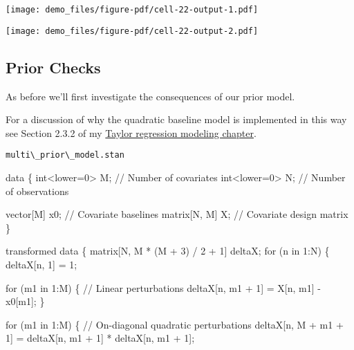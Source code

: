 \documentclass[
  letterpaper,
  DIV=11,
  numbers=noendperiod]{scrartcl}
\newenvironment{Shaded}{\begin{snugshade}}{\end{snugshade}}
\newcommand{\CommentTok}[1]{\textcolor[rgb]{0.37,0.37,0.37}{#1}}
\newcommand{\ControlFlowTok}[1]{\textcolor[rgb]{0.00,0.23,0.31}{#1}}
\newcommand{\DataTypeTok}[1]{\textcolor[rgb]{0.68,0.00,0.00}{#1}}
\newcommand{\DecValTok}[1]{\textcolor[rgb]{0.68,0.00,0.00}{#1}}
\newcommand{\KeywordTok}[1]{\textcolor[rgb]{0.00,0.23,0.31}{#1}}
\newcommand{\NormalTok}[1]{\textcolor[rgb]{0.00,0.23,0.31}{#1}}
\begin{document}
\texttt{[image: demo\_files/figure-pdf/cell-22-output-1.pdf]}

\texttt{[image: demo\_files/figure-pdf/cell-22-output-2.pdf]}

\subsection{Prior Checks}\label{prior-checks-1}

As before we'll first investigate the consequences of our prior model.

For a discussion of why the quadratic baseline model is implemented in
this way see Section 2.3.2 of my
\href{https://betanalpha.github.io/assets/case_studies/taylor_models.html\#232_Higher-Order_Implementations}{Taylor
regression modeling chapter}.

\begin{codelisting}

\caption{\texttt{multi\textbackslash\_prior\textbackslash\_model.stan}}

\begin{Shaded}
\begin{Highlighting}[]
\KeywordTok{data}\NormalTok{ \{}
  \DataTypeTok{int}\NormalTok{\textless{}}\KeywordTok{lower}\NormalTok{=}\DecValTok{0}\NormalTok{\textgreater{} M;  }\CommentTok{// Number of covariates}
  \DataTypeTok{int}\NormalTok{\textless{}}\KeywordTok{lower}\NormalTok{=}\DecValTok{0}\NormalTok{\textgreater{} N;  }\CommentTok{// Number of observations}
  
  \DataTypeTok{vector}\NormalTok{[M] x0;    }\CommentTok{// Covariate baselines}
  \DataTypeTok{matrix}\NormalTok{[N, M] X;  }\CommentTok{// Covariate design matrix}
\NormalTok{\}}

\KeywordTok{transformed data}\NormalTok{ \{}
  \DataTypeTok{matrix}\NormalTok{[N, M * (M + }\DecValTok{3}\NormalTok{) / }\DecValTok{2}\NormalTok{ + }\DecValTok{1}\NormalTok{] deltaX;}
  \ControlFlowTok{for}\NormalTok{ (n }\ControlFlowTok{in} \DecValTok{1}\NormalTok{:N) \{}
\NormalTok{    deltaX[n, }\DecValTok{1}\NormalTok{] = }\DecValTok{1}\NormalTok{;}
    
    \ControlFlowTok{for}\NormalTok{ (m1 }\ControlFlowTok{in} \DecValTok{1}\NormalTok{:M) \{}
      \CommentTok{// Linear perturbations}
\NormalTok{      deltaX[n, m1 + }\DecValTok{1}\NormalTok{] = X[n, m1] {-} x0[m1];}
\NormalTok{    \}}
    
    \ControlFlowTok{for}\NormalTok{ (m1 }\ControlFlowTok{in} \DecValTok{1}\NormalTok{:M) \{}
      \CommentTok{// On{-}diagonal quadratic perturbations}
\NormalTok{      deltaX[n, M + m1 + }\DecValTok{1}\NormalTok{] }
\NormalTok{        = deltaX[n, m1 + }\DecValTok{1}\NormalTok{] * deltaX[n, m1 + }\DecValTok{1}\NormalTok{];}
  

\end{Highlighting}
\end{Shaded}
\end{codelisting}
\end{document}
